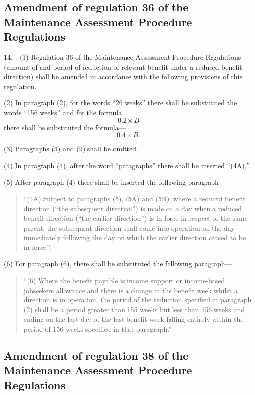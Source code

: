 \documentclass[a4paper]{article}
\begin{document}
\subsection[14. Amendment of regulation 36 of the Maintenance Assessment Procedure Regulations]{Amendment of regulation 36 of the Maintenance Assessment Procedure Regulations}

14.—(1) Regulation 36 of the Maintenance Assessment Procedure Regulations (amount of and period of reduction of relevant benefit under a reduced benefit direction) shall be amended in accordance with the following provisions of this regulation.

(2) In paragraph (2), for the words “26 weeks” there shall be substutited the words “156 weeks” and for the formula
\[0.2 \times B\] there shall be substituted the formula— \[0.4 \times B.\]

(3) Paragraphs (3) and (9) shall be omitted.

(4) In paragraph (4), after the word “paragraphs” there shall be inserted “(4A),”.

(5) After paragraph (4) there shall be inserted the following paragraph—
\begin{quotation}
“(4A) Subject to paragraphs (5), (5A) and (5B), where a reduced benefit direction (“the subsequent direction”) is made on a day when a reduced benefit direction (“the earlier direction”) is in force in respect of the same parent, the subsequent direction shall come into operation on the day immediately following the day on which the earlier direction ceased to be in force.”.
\end{quotation}

(6) For paragraph (6), there shall be substituted the following paragraph—
\begin{quotation}
“(6) Where the benefit payable is income support or income-based jobseekers allowance and there is a change in the benefit week whilst a direction is in operation, the period of the reduction specified in paragraph (2) shall be a period greater than 155 weeks but less than 156 weeks and ending on the last day of the last benefit week falling entirely within the period of 156 weeks specified in that paragraph.”
\end{quotation}

\subsection[15. Amendment of regulation 38 of the Maintenance Assessment Procedure Regulations]{Amendment of regulation 38 of the Maintenance Assessment Procedure Regulations}
\end{document}
